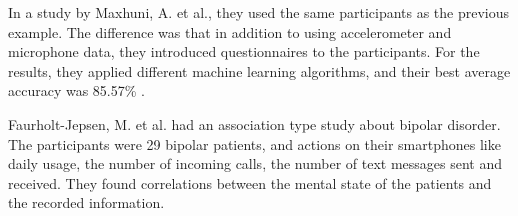 In a study by Maxhuni, A. et al., they used the same participants as the previous example. The difference was that in addition to using accelerometer and microphone data, they introduced questionnaires to the participants. For the results, they applied different machine learning algorithms, and their best average accuracy was 85.57\% \cite{maxhuni2016}.

Faurholt-Jepsen, M. et al. had an association type study about bipolar disorder. The participants were 29 bipolar patients, and actions on their smartphones like daily usage, the number of incoming calls, the number of text messages sent and received. They found correlations between the mental state of the patients and the recorded information. \cite{faurholt_smartphone_bipolar}